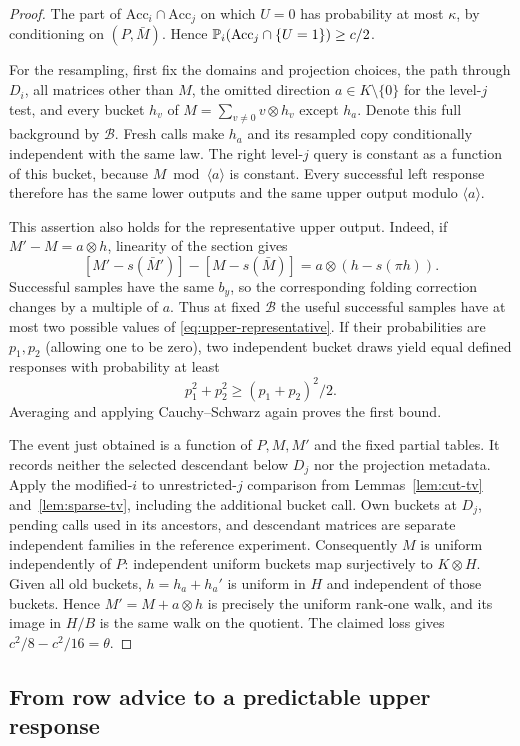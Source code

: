 \begin{proof}
The part of $\mathrm{Acc}_i\cap \mathrm{Acc}_j$ on which $U=0$ has probability at most $\kappa$,
by conditioning on $(P,\bar M)$.  Hence
$\mathbb P_i(\mathrm{Acc}_j\cap\{U=1\})\ge c/2$.

For the resampling, first fix the domains and projection choices, the path
through $D_i$, all matrices other than $M$, the omitted direction
$a\in K\setminus\{0\}$ for the level-$j$ test, and every bucket $h_v$ of
$M=\sum_{v\ne0}v\otimes h_v$ except $h_a$.  Denote this full background by
$\mathcal B$.  Fresh calls make $h_a$ and its resampled copy conditionally
independent with the same law.  The right level-$j$ query is constant as a
function of this bucket, because $M\bmod\langle a\rangle$ is constant.
Every successful left response therefore has the same lower outputs and
the same upper output modulo $\langle a\rangle$.

This assertion also holds for the representative upper output.  Indeed,
if $M'-M=a\otimes h$, linearity of the section gives
\[
 [M'-s(\bar M')]-[M-s(\bar M)]
        =a\otimes(h-s(\pi h)).
\]
Successful samples have the same $b_y$, so the corresponding folding
correction changes by a multiple of $a$.  Thus at fixed $\mathcal B$ the
useful successful samples have at most two possible values of
\eqref{eq:upper-representative}.  If their probabilities are $p_1,p_2$
(allowing one to be zero), two independent bucket draws yield equal defined
responses with probability at least
\[
 p_1^2+p_2^2\ge (p_1+p_2)^2/2.
\]
Averaging and applying Cauchy--Schwarz again proves the first bound.

The event just obtained is a function of $P,M,M'$ and the fixed partial
tables.  It records neither the selected descendant below $D_j$ nor the
projection metadata.  Apply the modified-$i$ to unrestricted-$j$ comparison
from Lemmas~\ref{lem:cut-tv} and~\ref{lem:sparse-tv}, including the additional
bucket call.  Own buckets at $D_j$, pending calls used in its ancestors,
and descendant matrices are separate independent families in the reference
experiment.  Consequently $M$ is uniform independently of $P$: independent
uniform buckets map surjectively to $K\otimes H$.  Given all old buckets,
$h=h_a+h_a'$ is uniform in $H$ and independent of those buckets.  Hence
$M'=M+a\otimes h$ is precisely the uniform rank-one walk, and its image in
$H/B$ is the same walk on the quotient.  The claimed loss gives
$c^2/8-c^2/16=\theta$.
\end{proof}

\subsection{From row advice to a predictable upper response}


